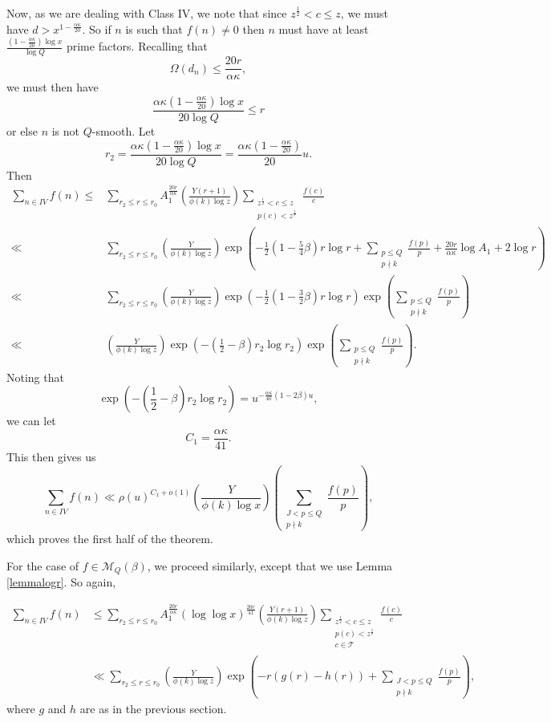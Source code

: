 \documentclass{amsart}
\begin{document}
Now, as we are dealing with Class IV, we note that since $z^\frac 12<c\leq z$, we must have $d>x^{1-\frac{\alpha \kappa}{20}}$.  So if $n$ is such that $f(n)\neq 0$ then $n$ must have at least $\frac{\left(1-\frac{\alpha \kappa}{20}\right)\log x}{\log Q}$ prime factors.  Recalling that
$$\Omega(d_n)\leq \frac{20r}{\alpha \kappa},$$
we must then have
$$\frac{\alpha\kappa \left(1-\frac{\alpha \kappa}{20}\right)\log x}{20\log Q}\leq r$$
or else $n$ is not $Q$-smooth.  Let 
$$r_2=\frac{\alpha\kappa \left(1-\frac{\alpha \kappa}{20}\right)\log x}{20\log Q}=\frac{\alpha\kappa \left(1-\frac{\alpha \kappa}{20}\right)}{20}u.$$
Then 
\begin{align*}
\sum_{n\in IV}f(n)\leq  &\sum_{r_2\leq r\leq r_0}A_1^{\frac{20r}{\alpha\kappa}}\left(\frac{Y(r+1)}{\phi(k)\log z}\right)\sum_{\substack{z^\frac 12<c\leq z \\ p(c)<z^\frac 1r }}\frac{f(c)}{c}\\
\ll  &\sum_{r_2\leq r\leq r_0}\left(\frac{Y}{\phi(k)\log z}\right)\exp\left(-\frac 12\left(1-\frac 54\beta\right)r\log r+\sum_{\substack{p\leq Q \\ p\nmid k}}\frac{f(p)}{p}+\frac{20r}{\alpha\kappa}\log A_1+2\log r\right)\\
\ll  &\sum_{r_2\leq r\leq r_0}\left(\frac{Y}{\phi(k)\log z}\right)\exp\left(-\frac 12\left(1-\frac 32\beta\right)r\log r\right)\exp\left(\sum_{\substack{p\leq Q \\ p\nmid k}}\frac{f(p)}{p}\right)\\
\ll  &\left(\frac{Y}{\phi(k)\log z}\right)\exp\left(-\left(\frac 12-\beta\right)r_2\log r_2\right)\exp\left(\sum_{\substack{p\leq Q \\ p\nmid k}}\frac{f(p)}{p}\right).
\end{align*}
Noting that 
$$\exp\left(-\left(\frac 12-\beta\right)r_2\log r_2\right)=u^{-\frac{\alpha\kappa}{40}\left(1-2\beta\right)u},$$
we can let $$C_1=\frac{\alpha\kappa}{41}.$$ 
This then gives us 
$$\sum_{n\in IV}f(n)\ll \rho(u)^{C_1+o(1)}\left(\frac{Y}{\phi(k)\log x}\right)\left(\sum_{\substack{J<p\leq Q \\ p\nmid k}}\frac{f(p)}{p}\right),$$
which proves the first half of the theorem.

For the case of $f\in \mathcal M_Q(\beta)$, we proceed similarly, except that we use Lemma \ref{lemmalogr}.  So again,


\begin{align*}
\sum_{n\in IV}f(n)
&\leq  \sum_{r_2\leq r\leq r_0}A_1^{\frac{20r}{\alpha\kappa}}\left(\log\log x\right)^{\frac{20r}{41}}\left(\frac{Y(r+1)}{\phi(k)\log z}\right)\sum_{\substack{z^\frac 12<c\leq z \\ p(c)<z^\frac 1r \\ c\in \mathcal T}}\frac{f(c)}{c}\\
&\ll  \sum_{r_2\leq r\leq r_0}\left(\frac{Y}{\phi(k)\log z}\right)\exp\left(-r(g(r)-h(r))+\sum_{\substack{J<p\leq Q \\ p\nmid k}}\frac{f(p)}{p}\right),
\end{align*}
where $g$ and $h$ are as in the previous section.
\end{document}
